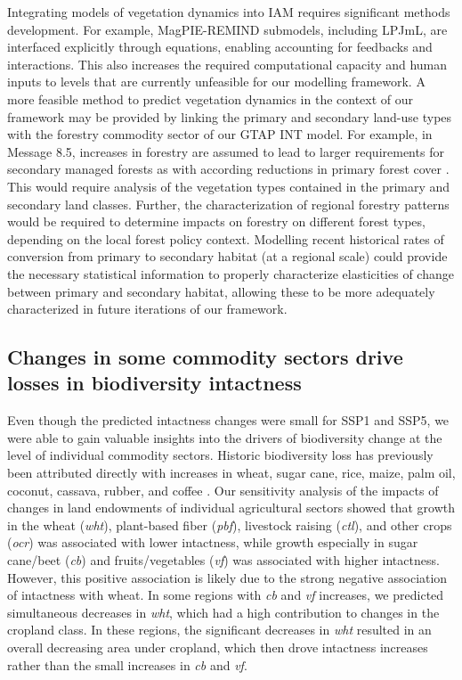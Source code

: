 \documentclass[titlesmallcaps,copyrightpage]{uomthesis}\usepackage[]{graphicx}\usepackage[]{color}
\begin{document}
Integrating models of vegetation dynamics into IAM requires significant methods development. For example, MagPIE-REMIND submodels, including LPJmL, are interfaced explicitly through equations, enabling accounting for feedbacks and interactions. This also increases the required computational capacity and human inputs to levels that are currently unfeasible for our modelling framework. A more feasible method to predict vegetation dynamics in the context of our framework may be provided by linking the primary and secondary land-use types with the forestry commodity sector of our GTAP INT model. For example, in Message 8.5, increases in forestry are assumed to lead to larger requirements for secondary managed forests as with according reductions in primary forest cover \citep{riahi_rcp_2011}. This would require analysis of the vegetation types contained in the primary and secondary land classes. Further, the characterization of regional forestry patterns would be required to determine impacts on forestry on different forest types, depending on the local forest policy context. Modelling recent historical rates of conversion from primary to secondary habitat (at a regional scale) could provide the necessary statistical information to properly characterize elasticities of change between primary and secondary habitat, allowing these to be more adequately characterized in future iterations of our framework. 

\subsection{Changes in some commodity sectors drive losses in biodiversity intactness}
Even though the predicted intactness changes were small for SSP1 and SSP5, we were able to gain valuable insights into the drivers of biodiversity change at the level of individual commodity sectors. Historic biodiversity loss has previously been attributed directly with increases in wheat, sugar cane, rice, maize, palm oil, coconut, cassava, rubber, and coffee \citep{chaudhary_land_2016}. Our sensitivity analysis of the impacts of changes in land endowments of individual agricultural sectors showed that growth in the wheat (\textit{wht}), plant-based fiber (\textit{pbf}), livestock raising (\textit{ctl}), and other crops (\textit{ocr}) was associated with lower intactness, while growth especially in sugar cane/beet (\textit{c\textunderscore b}) and fruits/vegetables (\textit{v\textunderscore f}) was associated with higher intactness. However, this positive association is likely due to the strong negative association of intactness with wheat. In some regions with \textit{c\textunderscore b} and \textit{v\textunderscore f} increases, we predicted simultaneous decreases in \textit{wht}, which had a high contribution to changes in the cropland class. In these regions, the significant decreases in \textit{wht} resulted in an overall decreasing area under cropland, which then drove intactness increases rather than the small increases in \textit{c\textunderscore b} and \textit{v\textunderscore f}.
\end{document}
